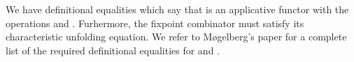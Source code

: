 \begin{AgdaAlign}
We have definitional equalities which say that  is an applicative functor with the operations  and .
Furhermore, the fixpoint combinator  must satisfy its characteristic unfolding equation.
We refer to M{\o}gelberg's paper \cite{Mogelberg14} for a complete list of the required definitional equalities for  and .
\end{AgdaAlign}
